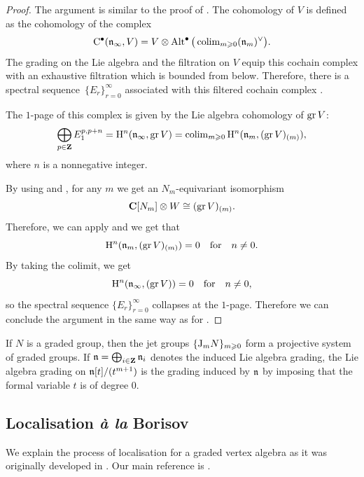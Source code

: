 \begin{proof}
	The argument is similar to the proof of . The cohomology of $V$ is defined as the cohomology of the complex
	\[ \mathrm{C}^\bullet(\mathfrak n_\infty, V) = V \otimes \operatorname{Alt}^\bullet\big(\operatorname{colim}\limits_{m \geqslant 0} (\mathfrak n_m)^\vee\big). \]
	The grading on the Lie algebra and the filtration on $V$ equip this cochain complex with an exhaustive filtration which is bounded from below. Therefore, there is a spectral sequence~$\{E_{r}\}_{r=0}^\infty$ associated with this filtered cochain complex \cite[Section~5.4]{weibel1994introduction}.
	
	The $1$-page of this complex is given by the Lie algebra cohomology of $\operatorname{gr} V$:
	\[ \bigoplus_{p \in \mathbf{Z}} E_1^{p, p + n} = \mathrm{H}^{n}(\mathfrak n_\infty, \operatorname{gr} V) = \operatorname{colim}\limits_{m \geqslant 0} \mathrm{H}^{n}(\mathfrak n_m, (\operatorname{gr} V)_{(m)}), \]
	where $n$ is a nonnegative integer.
	
	By using  and , for any $m$ we get an $N_m$-equivariant isomorphism 
	\[ \mathbf{C}[N_m] \otimes W \cong (\operatorname{gr} V)_{(m)}. \]
	Therefore, we can apply  and we get that
	\[ \mathrm{H}^{n}(\mathfrak n_m, (\operatorname{gr} V)_{(m)}) = 0 \quad \text{for} \quad n \neq 0. \]
	By taking the colimit, we get
	\[ \mathrm{H}^{n}(\mathfrak n_\infty, (\operatorname{gr} V)) = 0 \quad \text{for} \quad n \neq 0, \]
	so the spectral sequence $\{E_{r}\}_{r=0}^\infty$ collapses at the $1$-page. Therefore we can conclude the argument in the same way as for .
\end{proof}

\begin{example} \label{example:grading-jet-groups}
	If $N$ is a graded group, then the jet groups $\{\mathrm{J}_m N\}_{m \geqslant 0}$ form a projective system of graded groups. If $\mathfrak n = \bigoplus_{i \in \mathbf{Z}} \mathfrak n_i$ denotes the induced Lie algebra grading, the Lie algebra grading on $\mathfrak n[t]/(t^{m+1})$ is the grading induced by $\mathfrak n$ by imposing that the formal variable $t$ is of degree $0$.
\end{example}

\subsection{Localisation \emph{à la} Borisov} \label{subsection:localisation-vertex}

We explain the process of localisation for a graded vertex algebra as it was originally developed in \cite{borisov2001vertex,malikov1999chiral}. Our main reference is \cite[Sections 2 and 3]{arakawa2026faithful}.

